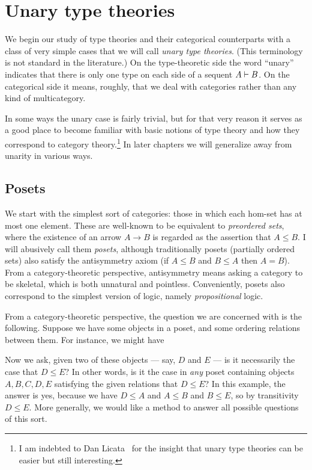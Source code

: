 \chapter{Unary type theories}
\label{chap:unary}

We begin our study of type theories and their categorical counterparts with a class of very simple cases that we will call \emph{unary type theories}.
(This terminology is not standard in the literature.)
On the type-theoretic side the word ``unary'' indicates that there is only one type on each side of a sequent $A\vdash B$.
On the categorical side it means, roughly, that we deal with categories rather than any kind of multicategory.

In some ways the unary case is fairly trivial, but for that very reason it serves as a good place to become familiar with basic notions of type theory and how they correspond to category theory.\footnote{I am indebted to Dan Licata~\cite{ls:1var-adjoint-logic} for the insight that unary type theories can be easier but still interesting.}
In later chapters we will generalize away from unarity in various ways.


\section{Posets}
\label{sec:poset}

We start with the simplest sort of categories: those in which each hom-set has at most one element.
These are well-known to be equivalent to \emph{preordered sets}, where the existence of an arrow $A\to B$ is regarded as the assertion that $A\le B$.
I will abusively call them \emph{posets}, although traditionally posets (partially ordered sets) also satisfy the antisymmetry axiom (if $A\le B$ and $B\le A$ then $A=B$).
From a category-theoretic perspective, antisymmetry means asking a category to be skeletal, which is both unnatural and pointless.
Conveniently, posets also correspond to the simplest version of logic, namely \emph{propositional} logic.

From a category-theoretic perspective, the question we are concerned with is the following.
Suppose we have some objects in a poset, and some ordering relations between them.
For instance, we might have
Now we ask, given two of these objects --- say, $D$ and $E$ --- is it necessarily the case that $D\le E$?
In other words, is it the case in \emph{any} poset containing objects $A,B,C,D,E$ satisfying the given relations that $D\le E$?
In this example, the answer is yes, because we have $D\le A$ and  $A\le B$ and $B\le E$, so by transitivity $D\le E$.
More generally, we would like a method to answer all possible questions of this sort.

